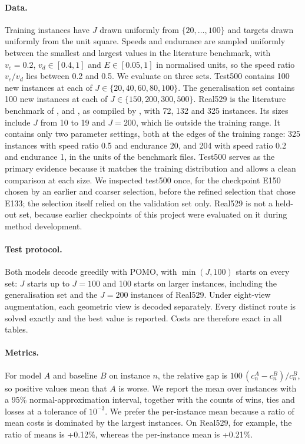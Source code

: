 \documentclass[preprint,12pt,authoryear]{elsarticle}
\begin{document}
\paragraph{Data.} Training instances have $J$ drawn uniformly from $\{20,\dots,100\}$ and targets drawn uniformly from the unit square. Speeds and endurance are sampled uniformly between the smallest and largest values in the literature benchmark, with $v_{c} = 0.2$, $v_{d} \in [0.4, 1]$ and $E \in [0.05, 1]$ in normalised units, so the speed ratio $v_{c}/v_{d}$ lies between 0.2 and 0.5. We evaluate on three sets. Test500 contains 100 new instances at each of $J \in \{20,40,60,80,100\}$. The generalisation set contains 100 new instances at each of $J \in \{150,200,300,500\}$. Real529 is the literature benchmark of \citet{gambella2018}, \citet{erdogan2021} and \citet{poikonen2020}, as compiled by \citet{li2025}, with 72, 132 and 325 instances. Its sizes include $J$ from 10 to 19 and $J = 200$, which lie outside the training range. It contains only two parameter settings, both at the edges of the training range: 325 instances with speed ratio 0.5 and endurance 20, and 204 with speed ratio 0.2 and endurance 1, in the units of the benchmark files. Test500 serves as the primary evidence because it matches the training distribution and allows a clean comparison at each size. We inspected test500 once, for the checkpoint E150 chosen by an earlier and coarser selection, before the refined selection that chose E133; the selection itself relied on the validation set only. Real529 is not a held-out set, because earlier checkpoints of this project were evaluated on it during method development.

\paragraph{Test protocol.} Both models decode greedily with POMO, with $\min(J,100)$ starts on every set: $J$ starts up to $J = 100$ and 100 starts on larger instances, including the generalisation set and the $J = 200$ instances of Real529. Under eight-view augmentation, each geometric view is decoded separately. Every distinct route is solved exactly and the best value is reported. Costs are therefore exact in all tables.

\paragraph{Metrics.} For model $A$ and baseline $B$ on instance $n$, the relative gap is $100\,(c^{A}_{n} - c^{B}_{n})/c^{B}_{n}$, so positive values mean that $A$ is worse. We report the mean over instances with a 95\% normal-approximation interval, together with the counts of wins, ties and losses at a tolerance of $10^{-3}$. We prefer the per-instance mean because a ratio of mean costs is dominated by the largest instances. On Real529, for example, the ratio of means is +0.12\%, whereas the per-instance mean is +0.21\%.
\end{document}
